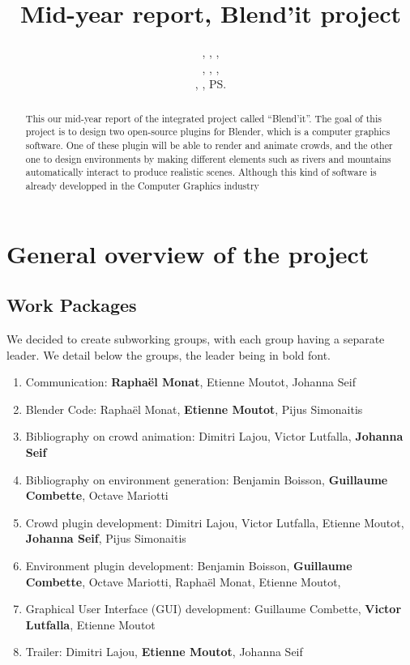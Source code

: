 \documentclass[a4paper,11pt]{article}
\title{Mid-year report, Blend'it project}
\author{\bb, \gc, \dl,\\ \vl, \om, \mr,\\ \me, \js, \ps}
\newcommand\bb{Benjamin Boisson}
\newcommand\gc{Guillaume Combette}
\newcommand\dl{Dimitri Lajou}
\newcommand\vl{Victor Lutfalla}
\newcommand\om{Octave Mariotti}
\newcommand\mr{Raphaël Monat} %
\newcommand\me{Etienne Moutot} %
\newcommand\js{Johanna Seif}
\newcommand\ps{Pijus Simonaitis}
\begin{document}
\maketitle

\begin{abstract}
This our mid-year report of the integrated project called ``Blend'it''. The goal of this project is to design two open-source plugins for Blender, which is a computer graphics software. One of these plugin will be able to render and animate crowds, and the other one to design environments by making different elements such as rivers and mountains automatically interact to produce realistic scenes. Although this kind of software is already developped in the Computer Graphics industry
\end{abstract}


\tableofcontents

\section{General overview of the project}




\subsection{Work Packages}
We decided to create subworking groups, with each group having a separate leader. We detail below the groups, the leader being in bold font.

\begin{enumerate}[label=WP\arabic*:, start=0]
\item Communication: \textbf{\mr}, \me, \js
\item Blender Code: \mr, \textbf{\me}, \ps
\item Bibliography on crowd animation: \dl, \vl, \textbf{\js}
\item Bibliography on environment generation: \bb, \textbf{\gc}, \om
\item Crowd plugin development: \dl, \vl, \me, \textbf{\js}, \ps
\item Environment plugin development: \bb, \textbf{\gc}, \om, \mr, \me,
\item Graphical User Interface (GUI) development: \gc, \textbf{\vl}, \me
\item Trailer: \dl, \textbf{\me}, \js
\end{enumerate}
\end{document}
